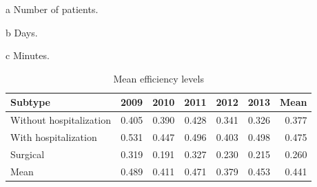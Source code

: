 \documentclass[11pt,a4paper,oneside]{article}
\begin{document}
\begin{table}[htbp]
{\begin{threeparttable}
\begin{tabular}{rlrrrrr}
    \bottomrule
    \end{tabular}
 \begin{tablenotes}
 \item[a]Number of patients.
 \item[b]Days.
 \item[c]Minutes.
 \end{tablenotes}
 \end{threeparttable}}
\end{table}

\vspace*{\fill}

\pagebreak
\clearpage

\vspace*{\fill}

\begin{table}[htbp]
  \centering
  \caption{Mean efficiency levels}
    \begin{tabular}{lrrrrrr}
    \toprule
    Subtype & 2009  & 2010  & 2011  & 2012  & 2013  & \multicolumn{1}{l}{Mean} \\
    \midrule
    Without hospitalization & 0.405 & 0.390 & 0.428 & 0.341 & 0.326 & 0.377 \\
    With hospitalization & 0.531 & 0.447 & 0.496 & 0.403 & 0.498 & 0.475 \\
    Surgical  & 0.319 & 0.191 & 0.327 & 0.230 & 0.215 & 0.260 \\
    \midrule
    Mean  & 0.489 & 0.411 & 0.471 & 0.379 & 0.453 & 0.441 \\
    \bottomrule
    \end{tabular}
  \label{tab:eff_scores}
\end{table}


\vspace*{\fill}

\pagebreak
\clearpage
\end{document}
